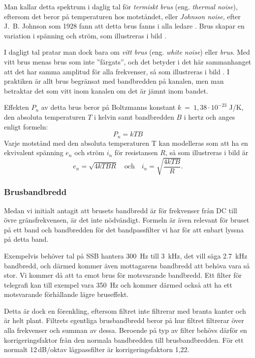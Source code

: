 Man kallar detta spektrum i daglig tal för \emph{termiskt brus}
(eng. \emph{thermal noise}), eftersom det beror på temperaturen hos motståndet,
eller \emph{Johnson noise}, efter J.~B. Johnson som 1928 fann att detta brus
fanns i alla ledare \cite{ott1988}.
Brus skapar en variation i spänning och ström, som illustreras i bild
.

I dagligt tal pratar man dock bara om \emph{vitt brus} (eng.
\emph{white noise}) eller \emph{brus}.
Med vitt brus menas brus som inte ''färgats'', och det betyder i det här
sammanhanget att det har samma amplitud för alla frekvenser, så som illustreras
i bild .
I praktiken är allt brus begränsat med bandbredden på kanalen, men man
betraktar det som vitt inom kanalen om det är jämnt inom bandet.

Effekten \(P_n\) av detta brus beror på Boltzmanns konstant
\(k\ =\ 1,38 \cdot 10^{-23}\) J/K, den absoluta temperaturen \(T\) i
kelvin samt bandbredden \(B\) i hertz och anges enligt formeln:
\[P_n = k T B\]
Varje motstånd med den absoluta temperaturen T kan modelleras som att ha en
ekvivalent spänning \(e_n\) och ström \(i_n\) för resistansen \(R\),
så som illustreras i bild  är
\[e_n = \sqrt{4kTBR}\quad\text{och}\quad i_n = \sqrt{\dfrac{4kTB}{R}}.\]
\subsubsection{Brusbandbredd}

Medan vi initialt antagit att brusets bandbredd är för frekvenser
från DC till övre gränsfrekvensen, är det inte nödvändigt.
Formeln är även relevant för bruset på ett band och bandbredden för det
bandpassfilter vi har för att enbart lyssna på detta band.

Exempelvis behöver tal på SSB hantera \qty{300}{\hertz} till \qty{3}{\kilo\hertz},
det vill säga \qty{2,7}{\kilo\hertz} bandbredd, och därmed kommer även
mottagarens bandbredd att behöva vara så stor.
Vi kommer då att ta emot brus för motsvarande bandbredd.
Ett filter för telegrafi kan till exempel vara \qty{350}{\hertz} och kommer
därmed också att ha ett motsvarande förhållande lägre bruseffekt.

Detta är dock en förenkling, eftersom filtret inte filtrerar med branta kanter
och är helt plant.
Filtrets egentliga brusbandbredd beror på hur filtret filtrerar över
alla frekvenser och summan av dessa.
Beroende på typ av filter behövs därför en korrigeringsfaktor
från den normala bandbredden till brusbandbredden.
För ett normalt 12\,dB/oktav lågpassfilter är korrigeringsfaktorn 1,22.

